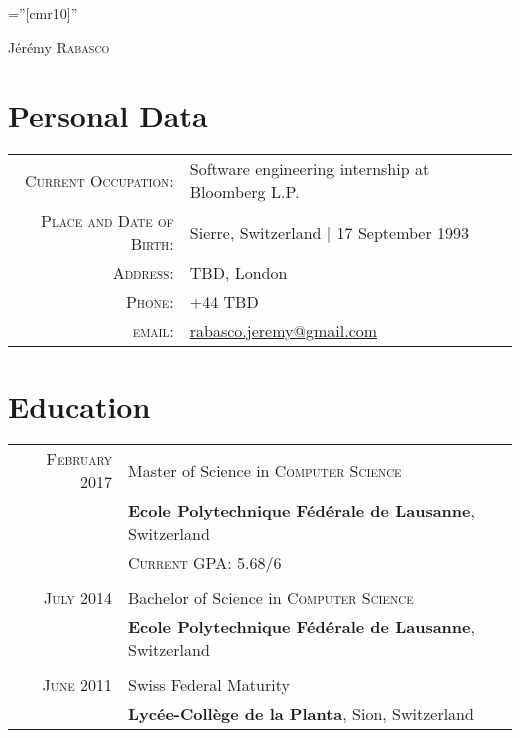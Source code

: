 \documentclass[a4paper,10pt]{article}
\begin{document}
\pagestyle{empty}
\font\fb=''[cmr10]''

\par{\centering
		{\Huge Jérémy \textsc{Rabasco}
	}\bigskip\par}

\section{Personal Data}

\begin{tabular}{rl}
	\textsc{Current Occupation:} & Software engineering internship at Bloomberg L.P.\\
	\textsc{Place and Date of Birth:} & Sierre, Switzerland | 17 September 1993 \\
	\textsc{Address:}   & TBD, London \\
	\textsc{Phone:}     & +44 TBD\\
	\textsc{email:}     & \href{mailto:rabasco.jeremy@gmail.com}{rabasco.jeremy@gmail.com}
\end{tabular}

\section{Education}
\begin{tabular}{rl}	
	\textsc{February 2017} & Master of Science in \textsc{Computer Science} \\
	& \textbf{Ecole Polytechnique Fédérale de Lausanne}, Switzerland\\
	&\normalsize \textsc{Current GPA}: 5.68/6\\\\
	\textsc{July} 2014 & Bachelor of Science in \textsc{Computer Science}\\
	& \textbf{Ecole Polytechnique Fédérale de Lausanne}, Switzerland\\\\
	\textsc{June 2011} & Swiss Federal Maturity\\
	&\textbf{Lycée-Collège de la Planta}, Sion, Switzerland
\end{tabular}

\end{document}
